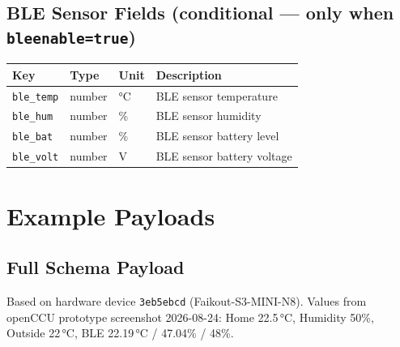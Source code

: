 \documentclass[11pt,a4paper]{article}
\newcommand{\field}[1]{\texttt{\color{codegreen}#1}}
\begin{document}
\subsection{BLE Sensor Fields (conditional — only when \texttt{bleenable=true})}

\begin{tabular}{@{}llll@{}}
\toprule
\textbf{Key} & \textbf{Type} & \textbf{Unit} & \textbf{Description} \\
\midrule
\rowcolor{lightbg}
\field{ble\_temp} & number & °C & BLE sensor temperature \\
\field{ble\_hum}  & number & \% & BLE sensor humidity \\
\rowcolor{lightbg}
\field{ble\_bat}  & number & \% & BLE sensor battery level \\
\field{ble\_volt} & number & V  & BLE sensor battery voltage \\
\bottomrule
\end{tabular}

\section{Example Payloads}
\label{app:examples}

\subsection{Full Schema Payload}

Based on hardware device \texttt{3eb5ebcd} (Faikout-S3-MINI-N8). Values from openCCU prototype screenshot 2026-08-24: Home 22.5\,°C, Humidity 50\%, Outside 22\,°C, BLE 22.19\,°C / 47.04\% / 48\%.
\end{document}
